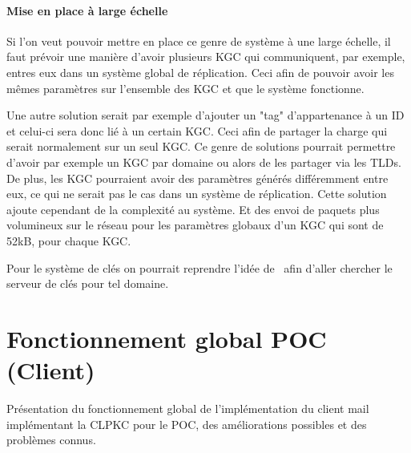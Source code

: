 \paragraph*{Mise en place à large échelle}
Si l'on veut pouvoir mettre en place ce genre de système à une large échelle, il faut prévoir une manière d'avoir plusieurs KGC qui communiquent, par exemple, entres eux dans un système global de réplication. Ceci afin de pouvoir avoir les mêmes paramètres sur l'ensemble des KGC et que le système fonctionne.

Une autre solution serait par exemple d'ajouter un "tag" d'appartenance à un ID et celui-ci sera donc lié à un certain KGC. Ceci afin de partager la charge qui serait normalement sur un seul KGC. Ce genre de solutions pourrait permettre d'avoir par exemple un KGC par domaine ou alors de les partager via les TLDs. De plus, les KGC pourraient avoir des paramètres générés différemment entre eux, ce qui ne serait pas le cas dans un système de réplication. Cette solution ajoute cependant de la complexité au système. Et des envoi de paquets plus volumineux sur le réseau pour les paramètres globaux d'un KGC qui sont de 52kB, pour chaque KGC.

Pour le système de clés on pourrait reprendre l'idée de~\cite{journals/ijnsec/BalakrishnanR16} afin d'aller chercher le serveur de clés pour tel domaine.
\section{Fonctionnement global POC (Client)}
Présentation du fonctionnement global de l'implémentation du client mail implémentant la CLPKC pour le POC, des améliorations possibles et des problèmes connus.
